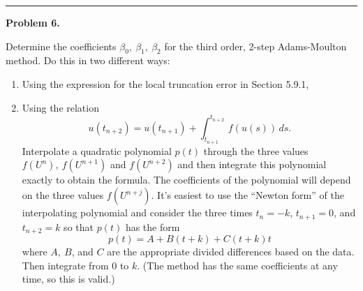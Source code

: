 \documentclass[10pt]{article}
\begin{document}



\newpage
\hrule
{\bf Problem 6.}

Determine the coefficients $\beta_0,~\beta_1,~\beta_2$ for the third
order, 2-step Adams-Moulton method.  Do this in two different ways:
\begin{enumerate} 
 \item Using the expression for the local truncation error in Section 5.9.1,
 \item Using the relation
 \[
 u(t_{n+2}) = u(t_{n+1}) + \int_{t_{n+1}}^{t_{n+2}}\,f(u(s))\,ds.
 \]
 Interpolate  a quadratic polynomial $p(t)$ through the three values
 $f(U^n),~f(U^{n+1})$ and $f(U^{n+2})$ and then integrate this polynomial
 exactly to obtain the formula.  The coefficients of the polynomial will
 depend on the three values $f(U^{n+j})$.   It's easiest to use the
 ``Newton form'' of the interpolating polynomial and consider the three
times $t_n=-k$, $t_{n+1}=0$, and $t_{n+2}=k$ so that $p(t)$ has the form
\[
p(t) = A + B(t+k) + C(t+k)t
\]
where $A,~B$, and $C$ are the appropriate divided differences based on the
data.  Then integrate from $0$ to $k$.   (The method has the same
coefficients at any time, so this is valid.)
\end{enumerate}




\end{document}
